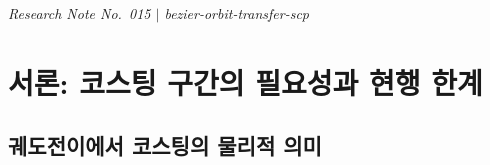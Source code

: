 \documentclass[11pt]{article}
\begin{document}
\drawborder
\thispagestyle{firstpage}


{\normalsize\textit{Research Note No.~015 $|$ bezier-orbit-transfer-scp}}\par\medskip

\def\lighterdate{March 29, 2026}


\begin{abstract}
\cite{report003,report004}에서 추진 가속도를 Bernstein 기저로 전개하는 베지어 궤적 성형을
정식화하였으나, Bernstein 다항식은 유한 구간에서 항등적으로 0이 될 수 없으므로
\textbf{코스팅(추력\,=\,0) 구간}을 구조적으로 표현할 수 없다.
\cite{efc001}의 GCF 함수족과 \cite{efc003}의 베지어--GCF 직합 공간은
코스팅 구간의 부분적 해결을 시도하지만,
전역 베지어의 전역 지지에 의해 구간 내 잔차 $O(\Delta)$가 남아 정확한 코스팅이 불가능하다.

본 보고서는 이 한계를 분석한 뒤,
\cite{efc005}의 \textbf{BLADE}(Bernstein Local Adaptive Degree Elements) 프레임워크가
이를 근본적으로 해결함을 보인다.
BLADE는 각 세그먼트에 국소 Bernstein 기저를 배치하여
$\mathbf{p}_k = \mathbf{0}$으로 \textbf{정확한 코스팅}을 달성하며,
블록 대각 Gram 행렬, perspective 변환에 의한 시간배분 SOCP(Second-Order Cone Programming)
볼록화, $\ell_1$ 정규화에 의한 코스팅 자동 결정을 제공한다.
GCF($n{=}0$)와 전역 베지어($K{=}1$)가 $(K, n)$ 매개변수의 양 극단으로
정확히 포함되는 통합 프레임워크이며,
궤도전이 SCP로의 자연스러운 확장 방안을 제시한다.
\end{abstract}

\section{서론: 코스팅 구간의 필요성과 현행 한계}
\label{sec:intro}

\subsection{궤도전이에서 코스팅의 물리적 의미}
\end{document}
